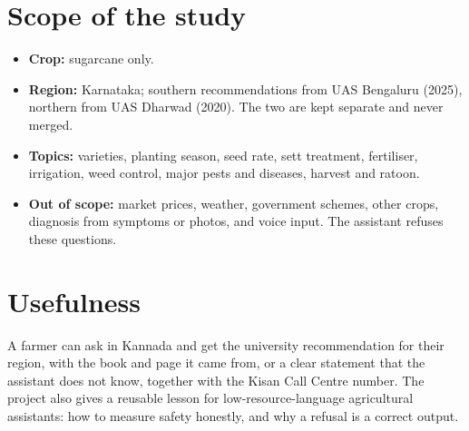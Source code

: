 \section{Scope of the study}
\begin{itemize}
  \item \textbf{Crop:} sugarcane only.
  \item \textbf{Region:} Karnataka; southern recommendations from UAS Bengaluru (2025),
    northern from UAS Dharwad (2020). The two are kept separate and never merged.
  \item \textbf{Topics:} varieties, planting season, seed rate, sett treatment,
    fertiliser, irrigation, weed control, major pests and diseases, harvest and ratoon.
  \item \textbf{Out of scope:} market prices, weather, government schemes, other crops,
    diagnosis from symptoms or photos, and voice input. The assistant refuses these
    questions.
\end{itemize}

\section{Usefulness}
A farmer can ask in Kannada and get the university recommendation for their region,
with the book and page it came from, or a clear statement that the assistant does not
know, together with the Kisan Call Centre number. The project also gives a reusable
lesson for low-resource-language agricultural assistants: how to measure safety honestly,
and why a refusal is a correct output.
